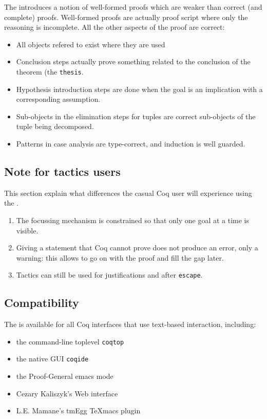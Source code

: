 The \DPL{} introduces a notion of well-formed
proofs which are weaker than correct (and complete)
proofs. Well-formed proofs are actually proof script where only the
reasoning is incomplete. All the other aspects of the proof are
correct:
\begin{itemize}
\item All objects refered to exist where they are used
\item Conclusion steps actually prove something related to the
  conclusion of the theorem (the {\tt thesis}.
\item Hypothesis introduction steps are done when the goal is an
  implication with a corresponding assumption.
\item Sub-objects in the elimination steps for tuples are correct
  sub-objects of the tuple being decomposed.
\item Patterns in case analysis are type-correct, and induction is well guarded.
\end{itemize}

\subsection{Note for tactics users}

This section explain what differences the casual Coq user will
experience using the \DPL .
\begin{enumerate}
\item The focussing mechanism is constrained so that only one goal at
  a time is visible.
\item Giving a statement that Coq cannot prove does not produce an
  error, only a warning: this allows to go on with the proof and fill
  the gap later.
\item Tactics can still be used for justifications and after
{\texttt{escape}}.
\end{enumerate}

\subsection{Compatibility}

The \DPL{} is available for all Coq interfaces that use
text-based interaction, including:
\begin{itemize}
\item the command-{}line toplevel {\texttt{coqtop}}
\item the native GUI {\texttt{coqide}}
\item the Proof-{}General emacs mode
\item Cezary Kaliszyk'{}s Web interface
\item L.E. Mamane'{}s tmEgg TeXmacs plugin
\end{itemize}

